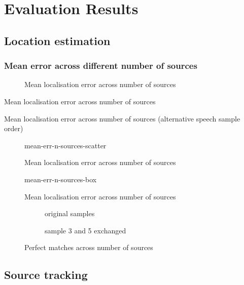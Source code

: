 \chapter{Evaluation Results}
\label{chap:results}

\section{Location estimation}
\subsection*{Mean error across different number of sources}

\begin{figure}[H]
	\centering
		
	\caption{Mean localisation error across number of sources}
\end{figure}

\begin{table}[H]
	\centering
	
	\caption{Mean localisation error across number of sources}
\end{table}

\begin{table}[H]
	\centering
	
	\caption{Mean localisation error across number of sources (alternative speech sample order)}
\end{table}


\begin{figure}[H]
	\centering
	{mean-err-n-sources-scatter}
	\caption{Mean localisation error across number of sources}
\end{figure}

\begin{figure}[H]
	\centering
	{mean-err-n-sources-box}
	\caption{Mean localisation error across number of sources}
\end{figure}

\begin{figure}[H]
	\centering
	\begin{subfigure}{0.49\textwidth}
		\centering
			
		\caption{original samples}
	\end{subfigure}
	\begin{subfigure}{0.49\textwidth}
		\centering
			
		\caption{sample 3 and 5 exchanged}
	\end{subfigure}
	\caption{Perfect matches across number of sources}
	\label{fig:perfect}
\end{figure}





\section{Source tracking}